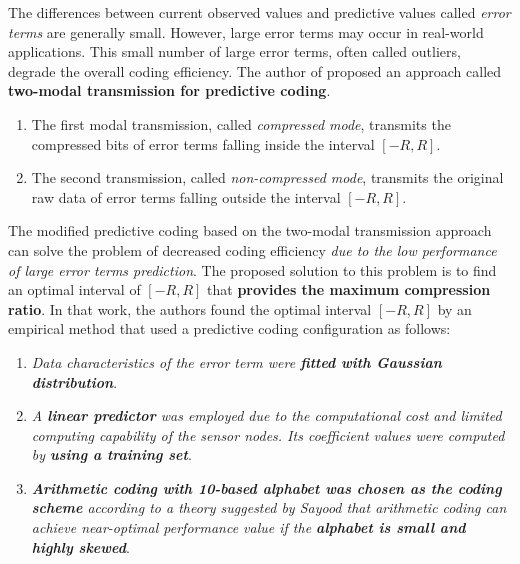 \begin{enumerate}
        The differences between current observed values and predictive values called \emph{\textcolor[rgb]{1,0,0}{error terms}} are generally small. However, large error terms may occur in real-world applications. This small number of large error terms, often called outliers, degrade the overall coding efficiency. The author of \cite{Huang2007} proposed an approach called \textbf{\textcolor[rgb]{1,0,0}{two-modal transmission for predictive coding}}.
        \begin{enumerate}
            \item The first modal transmission, called \emph{\textcolor[rgb]{1,0,0}{compressed mode}}, transmits the compressed bits of error terms falling inside the interval $\left[ -R,R \right]$. 
            \item The second transmission, called \emph{\textcolor[rgb]{1,0,0}{non-compressed mode}}, transmits the original raw data of error terms falling outside the interval $\left[ -R,R \right]$. 
        \end{enumerate}
        The modified predictive coding based on the two-modal transmission approach can solve the problem of decreased coding efficiency \emph{\textcolor[rgb]{1,0,0}{due to the low performance of large error terms prediction}}. The proposed solution to this problem is to find an optimal interval of $\left[ -R,R \right]$ that \textcolor[rgb]{1,0,0}{\textbf{provides the maximum compression ratio}}. In that work, the authors found the optimal interval $\left[ -R,R \right]$ by an \textcolor[rgb]{1,0,0}{empirical method that used a predictive coding configuration} as follows:
        \begin{enumerate}
            \item \emph{\textcolor[rgb]{1,0,0}{Data characteristics of the error term were \textbf{fitted with Gaussian distribution}}}. 
            \item \emph{\textcolor[rgb]{1,0,0}{A \textbf{linear predictor} was employed due to the computational cost and limited computing capability of the sensor nodes. Its coefficient values were computed by \textbf{using a training set}}}.
            \item \emph{\textcolor[rgb]{1,0,0}{\textbf{Arithmetic coding with 10-based alphabet was chosen as the coding scheme} according to a theory suggested by Sayood that arithmetic coding can achieve near-optimal performance value if the \textbf{alphabet is small and highly skewed}}}.
        \end{enumerate}


\end{enumerate}
